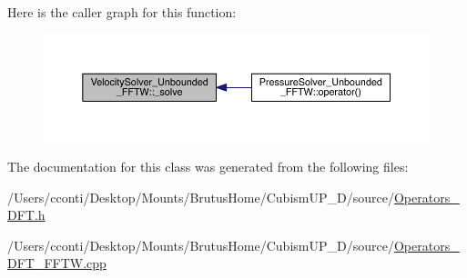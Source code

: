 Here is the caller graph for this function\+:\nopagebreak
\begin{figure}[H]
\begin{center}
\leavevmode
\includegraphics[width=350pt]{d7/d74/class_velocity_solver___unbounded___f_f_t_w_abe6acc32fcfbcad312a5cecad3bad332_icgraph}
\end{center}
\end{figure}




The documentation for this class was generated from the following files\+:\begin{DoxyCompactItemize}
\item 
/\+Users/cconti/\+Desktop/\+Mounts/\+Brutus\+Home/\+Cubism\+U\+P\+\_\+D/source/\hyperlink{_operators___d_f_t_8h}{Operators\+\_\+\+D\+F\+T.\+h}\item 
/\+Users/cconti/\+Desktop/\+Mounts/\+Brutus\+Home/\+Cubism\+U\+P\+\_\+D/source/\hyperlink{_operators___d_f_t___f_f_t_w_8cpp}{Operators\+\_\+\+D\+F\+T\+\_\+\+F\+F\+T\+W.\+cpp}\end{DoxyCompactItemize}
